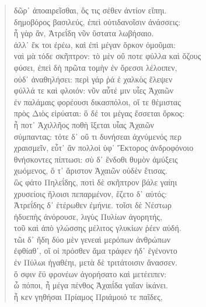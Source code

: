 \begin{Spacing}{1.5}
\begin{verse}
{\large\g δῶρ᾽ ἀποαιρεῖσθαι, ὅς τις σέθεν ἀντίον εἴπηι.  } \\
{\large\g δημοβόρος βασιλεύς, ἐπεὶ οὐτιδανοῖσιν ἀνάσσεις:  } \\
{\large\g ἦ γὰρ ἄν, Ἀτρεΐδη νῦν ὕστατα λωβήσαιο.  } \\
{\large\g ἀλλ᾽ ἔκ τοι ἐρέω, καὶ ἐπὶ μέγαν ὅρκον ὀμοῦμαι:  } \\
{\large\g ναὶ μὰ τόδε σκῆπτρον: τὸ μὲν οὔ ποτε φύλλα καὶ ὄζους  } \\
{\large\g φύσει, ἐπεὶ δὴ πρῶτα τομὴν ἐν ὄρεσσι λέλοιπεν,  } \\
{\large\g οὐδ᾽ ἀναθηλήσει: περὶ γάρ ῥά ἑ χαλκὸς ἔλεψεν  } \\
{\large\g φύλλά τε καὶ φλοιόν: νῦν αὖτέ μιν υἷες Ἀχαιῶν  } \\
{\large\g ἐν παλάμαις φορέουσι δικασπόλοι, οἵ τε θέμιστας  } \\
{\large\g πρὸς Διὸς εἰρύαται: ὃ δέ τοι μέγας ἔσσεται ὅρκος:  } \\
{\large\g ἦ ποτ᾽ Ἀχιλλῆος ποθὴ ἵξεται υἷας Ἀχαιῶν  } \\
{\large\g σύμπαντας: τότε δ᾽ οὔ τι δυνήσεαι ἀχνύμενός περ  } \\
{\large\g χραισμεῖν, εὖτ᾽ ἂν πολλοὶ ὑφ᾽ Ἕκτορος ἀνδροφόνοιο  } \\
{\large\g θνήσκοντες πίπτωσι: σὺ δ᾽ ἔνδοθι θυμὸν ἀμύξεις  } \\
{\large\g χωόμενος, ὅ τ᾽ ἄριστον Ἀχαιῶν οὐδὲν ἔτισας.  } \\
{\large\g ὣς φάτο Πηλεΐδης, ποτὶ δὲ σκῆπτρον βάλε γαίηι   } \\
{\large\g χρυσείοις ἥλοισι πεπαρμένον, ἕζετο δ᾽ αὐτός:  } \\
{\large\g Ἀτρεΐδης δ᾽ ἑτέρωθεν ἐμήνιε. τοῖσι δὲ Νέστωρ  } \\
{\large\g ἡδυεπὴς ἀνόρουσε, λιγὺς Πυλίων ἀγορητής,  } \\
{\large\g τοῦ καὶ ἀπὸ γλώσσης μέλιτος γλυκίων ῥέεν αὐδή.  } \\
{\large\g τῶι δ᾽ ἤδη δύο μὲν γενεαὶ μερόπων ἀνθρώπων  } \\
{\large\g ἐφθίαθ᾽, οἵ οἱ πρόσθεν ἅμα τράφεν ἠδ᾽ ἐγένοντο  } \\
{\large\g ἐν Πύλωι ἠγαθέηι, μετὰ δὲ τριτάτοισιν ἄνασσεν.  } \\
{\large\g  ὅ σφιν ἔϋ φρονέων ἀγορήσατο καὶ μετέειπεν:  } \\
{\large\g ὦ πόποι, ἦ μέγα πένθος Ἀχαιΐδα γαῖαν ἱκάνει.  } \\
{\large\g ἦ κεν γηθήσαι Πρίαμος Πριάμοιό τε παῖδες,  } \\

\end{verse}
\end{Spacing}
